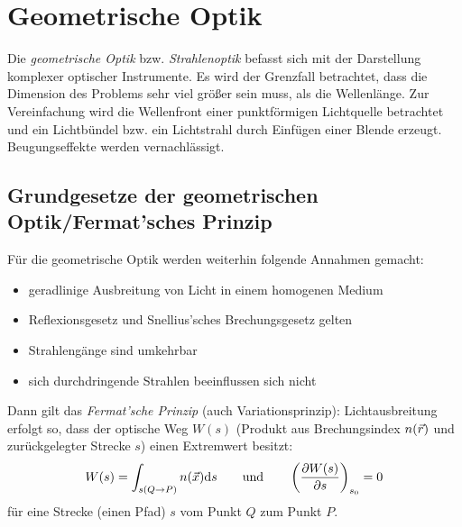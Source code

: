 
\chapter{Geometrische Optik}

Die \emph{geometrische Optik}
bzw. \emph{Strahlenoptik} befasst sich mit der
Darstellung komplexer optischer Instrumente.
Es wird der Grenzfall betrachtet, dass die Dimension des Problems sehr
viel größer sein muss, als die Wellenlänge.
Zur Vereinfachung wird die Wellenfront einer punktförmigen Lichtquelle
betrachtet und ein Lichtbündel bzw. ein Lichtstrahl durch Einfügen
einer Blende erzeugt. Beugungseffekte werden vernachlässigt.

\section[Fermat'sches Prinzip]
{Grundgesetze der geometrischen Optik/Fermat'sches Prinzip}
Für die geometrische Optik werden weiterhin folgende Annahmen gemacht:
\begin{itemize}
\item geradlinige Ausbreitung von Licht in einem homogenen Medium
\item Reflexionsgesetz und Snellius'sches Brechungsgesetz gelten
\item Strahlengänge sind umkehrbar
\item sich durchdringende Strahlen beeinflussen sich nicht
\end{itemize}
Dann gilt das \emph{Fermat'sche Prinzip}
(auch Variationsprinzip):
Lichtausbreitung erfolgt so, dass der optische Weg $W(s)$%
(Produkt aus Brechungsindex $n(\vecr)$ und zurückgelegter Strecke
$s$) einen Extremwert besitzt:
\begin{gather*}
  W(s) = \int_{s(Q\to P)}n(\vecx)\dd s
  \qquad\text{und}\qquad
  \left( \dif[W(s)]{s} \right)_{s_0} = 0
\end{gather*}%
%
für eine Strecke (einen Pfad) $s$ vom Punkt $Q$ zum Punkt $P$.

